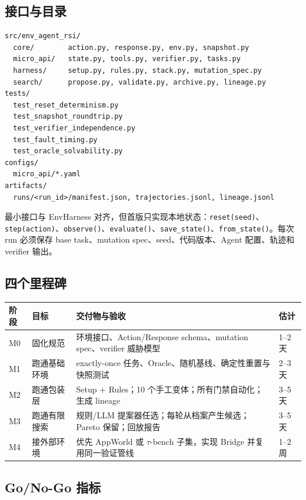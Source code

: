 \documentclass[11pt,a4paper,fontset=fandol]{ctexart}
\newcommand{\code}[1]{\texttt{#1}}
\begin{document}
\subsection{接口与目录}

\begin{verbatim}
src/env_agent_rsi/
  core/        action.py, response.py, env.py, snapshot.py
  micro_api/   state.py, tools.py, verifier.py, tasks.py
  harness/     setup.py, rules.py, stack.py, mutation_spec.py
  search/      propose.py, validate.py, archive.py, lineage.py
tests/
  test_reset_determinism.py
  test_snapshot_roundtrip.py
  test_verifier_independence.py
  test_fault_timing.py
  test_oracle_solvability.py
configs/
  micro_api/*.yaml
artifacts/
  runs/<run_id>/manifest.json, trajectories.jsonl, lineage.jsonl
\end{verbatim}

最小接口与 EnvHarness 对齐，但首版只实现本地状态：\code{reset(seed)}、\code{step(action)}、\code{observe()}、\code{evaluate()}、\code{save\_state()}、\code{from\_state()}。每次 run 必须保存 base task、mutation spec、seed、代码版本、Agent 配置、轨迹和 verifier 输出。

\subsection{四个里程碑}

\begin{longtable}{p{1.3cm}p{4cm}p{6.5cm}p{2.8cm}}
\toprule
阶段 & 目标 & 交付物与验收 & 估计 \\
\midrule
M0 & 固化规范 & 环境接口、Action/Response schema、mutation spec、verifier 威胁模型 & 1--2 天 \\
M1 & 跑通基础环境 & exactly-once 任务、Oracle、随机基线、确定性重置与快照测试 & 2--3 天 \\
M2 & 跑通包装层 & Setup + Rules；10 个手工变体；所有门禁自动化；生成 lineage & 3--5 天 \\
M3 & 跑通有限搜索 & 规则/LLM 提案器任选；每轮从档案产生候选；Pareto 保留；回放报告 & 3--5 天 \\
M4 & 接外部环境 & 优先 AppWorld 或 $\tau$-bench 子集，实现 Bridge 并复用同一验证管线 & 1--2 周 \\
\bottomrule
\end{longtable}

\subsection{Go/No-Go 指标}
\end{document}
